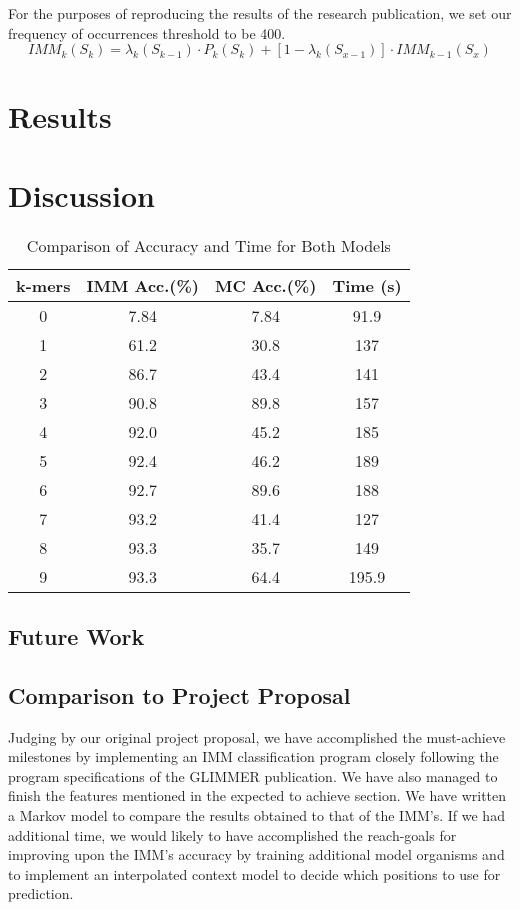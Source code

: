 \documentclass[11pt,letterpaper]{article}
\begin{document}
For the purposes of reproducing the results of the research publication, we set our frequency of occurrences threshold to be 400. 
\begin{equation}
IMM_k(S_k) = \lambda_k(S_{k-1}) \cdot P_k(S_k) + [1 - \lambda_k(S_{x-1})] \cdot IMM_{k-1}(S_x)
\end{equation}


\section{Results}

\section{Discussion}

\begin{table}
	\begin{center}
		\begin{tabular}{|c|c|c|c|}
			\hline \bf k-mers & \bf IMM Acc.(\%) & \bf MC Acc.(\%) & \bf Time (s) \\ \hline
			0 & 7.84 & 7.84 & 91.9 \\
			\hline
			1 & 61.2 & 30.8 & 137 \\
			\hline
			2 & 86.7 & 43.4 & 141 \\
			\hline		
			3 & 90.8 & 89.8 & 157 \\
			\hline		
			4 & 92.0 & 45.2 & 185 \\
			\hline		
			5 & 92.4 & 46.2 & 189 \\
			\hline
			6 & 92.7 & 89.6 & 188 \\
			\hline													
			7 & 93.2 & 41.4 & 127 \\
			\hline		
			8 & 93.3 & 35.7 & 149 \\
			\hline			
			9 & 93.3 & 64.4 & 195.9 \\
			\hline		
		\end{tabular}
	\end{center}
	\caption{\label{font-table} Comparison of Accuracy and Time for Both Models }
\end{table}

\subsection{Future Work}
\subsection{Comparison to Project Proposal}
Judging by our original project proposal, we have accomplished the must-achieve milestones by implementing an IMM classification program closely following the program specifications of the GLIMMER publication. We have also managed to finish the features mentioned in the expected to achieve section. We have written a Markov model to compare the results obtained to that of the IMM’s. If we had additional time, we would likely to have accomplished the reach-goals for improving upon the IMM’s accuracy by training additional model organisms and to implement an interpolated context model to decide which positions to use for prediction.
\end{document}
